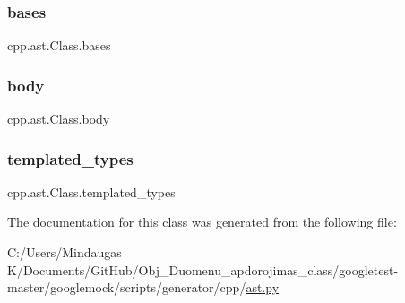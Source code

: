 \subsubsection{\texorpdfstring{bases}{bases}}
{\footnotesize\ttfamily cpp.\+ast.\+Class.\+bases}

\mbox{\label{classcpp_1_1ast_1_1_class_add39f61fdcf6dae42d79cac3dcbb7782}} 
\subsubsection{\texorpdfstring{body}{body}}
{\footnotesize\ttfamily cpp.\+ast.\+Class.\+body}

\mbox{\label{classcpp_1_1ast_1_1_class_a48ed0d3115656554d9134bc1787390fa}} 
\subsubsection{\texorpdfstring{templated\_types}{templated\_types}}
{\footnotesize\ttfamily cpp.\+ast.\+Class.\+templated\+\_\+types}



The documentation for this class was generated from the following file\+:\begin{DoxyCompactItemize}
\item 
C\+:/\+Users/\+Mindaugas K/\+Documents/\+Git\+Hub/\+Obj\+\_\+\+Duomenu\+\_\+apdorojimas\+\_\+class/googletest-\/master/googlemock/scripts/generator/cpp/\mbox{\hyperlink{googletest-master_2googlemock_2scripts_2generator_2cpp_2ast_8py}{ast.\+py}}\end{DoxyCompactItemize}
